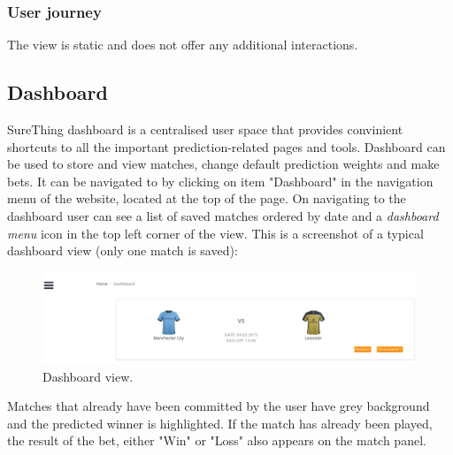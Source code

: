 \subsubsection*{User journey}
\label{subsec:playedmatchviewuserjourney}
The view is static and does not offer any additional interactions.

\subsection{Dashboard}
\label{subsec:dashboard}
SureThing dashboard is a centralised user space that provides convinient shortcuts to all the important prediction-related pages and tools. Dashboard can be used to store and view matches, change default prediction weights and make bets. It can be navigated to by clicking on item "Dashboard" in the navigation menu of the website, located at the top of the page. On navigating to the dashboard user can see a list of saved matches ordered by date and a \emph{dashboard menu} icon in the top left corner of the view. This is a screenshot of a typical dashboard view (only one match is saved):

\begin{figure}[H]
	\begin{center}
		\includegraphics[width=.90\textwidth]{impl/images/typicalDashboard}
		\caption{Dashboard view.} \label{fig:typicaldashboard}
	\end{center}
\end{figure}

Matches that already have been committed by the user have grey background and the predicted winner is highlighted. If the match has already been played, the result of the bet, either "Win" or "Loss" also appears on the match panel.

